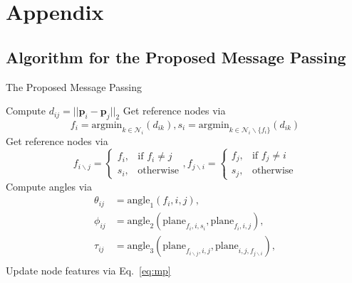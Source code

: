 \documentclass{article}
\begin{document}

 

\newpage
\appendix


\section{Appendix}

\subsection{Algorithm for the Proposed Message Passing} \label{sec:alg}

\begin{algorithm}[H]
\caption{The Proposed Message Passing}\label{alg:alg}
\begin{algorithmic}[1]
\STATE Compute $d_{ij}=||\mathrm{\textbf{p}}_i-\mathrm{\textbf{p}}_j||_2$
\ENDFOR
\STATE Get reference nodes via
\vspace{-6pt}
$$f_i=\mathrm{argmin}_{k\in\mathcal{N}_i} (d_{ik}), s_i=\mathrm{argmin}_{k\in\mathcal{N}_i \backslash \{f_{i}\}} (d_{ik})$$
\vspace{-16pt}
\ENDFOR
{}
\STATE Get reference nodes via
\vspace{-6pt}
$$f_{i\backslash j}= 
\begin{cases}
    f_i,& \text{if } f_i \neq j\\
    s_i,              & \text{otherwise}
\end{cases},
f_{j\backslash i}= 
\begin{cases}
    f_j,& \text{if } f_j \neq i\\
    s_j,              & \text{otherwise}
\end{cases}
$$
\vspace{-10pt}
\STATE Compute angles via
\vspace{-6pt}
\begin{equation*}
\begin{aligned}
    \theta_{ij} &= \mathrm{angle}_1(f_i,i,j), \\
    \phi_{ij} &= \mathrm{angle}_2(\mathrm{plane}_{f_i,i,s_i}, \mathrm{plane}_{f_i,i,j}), \\
    \tau_{ij} &= \mathrm{angle}_3(\mathrm{plane}_{f_{i\backslash j},i,j}, \mathrm{plane}_{i,j,f_{j\backslash i}}), \\
\end{aligned}
\end{equation*}
\vspace{-15pt}
\ENDFOR
\STATE Update node features via Eq.~\ref{eq:mp}
\ENDFOR
\end{algorithmic}
\end{algorithm}
\end{document}
